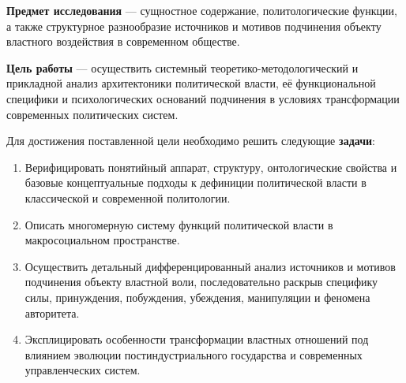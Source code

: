 \textbf{Предмет исследования} — сущностное содержание, политологические функции, а также структурное разнообразие источников и мотивов подчинения объекту властного воздействия в современном обществе.

\textbf{Цель работы} — осуществить системный теоретико-методологический и прикладной анализ архитектоники политической власти, её функциональной специфики и психологических оснований подчинения в условиях трансформации современных политических систем.

Для достижения поставленной цели необходимо решить следующие \textbf{задачи}:
\begin{enumerate}
    \item Верифицировать понятийный аппарат, структуру, онтологические свойства и базовые концептуальные подходы к дефиниции политической власти в классической и современной политологии.
    \item Описать многомерную систему функций политической власти в макросоциальном пространстве.
    \item Осуществить детальный дифференцированный анализ источников и мотивов подчинения объекту властной воли, последовательно раскрыв специфику силы, принуждения, побуждения, убеждения, манипуляции и феномена авторитета.
    \item Эксплицировать особенности трансформации властных отношений под влиянием эволюции постиндустриального государства и современных управленческих систем.
\end{enumerate}